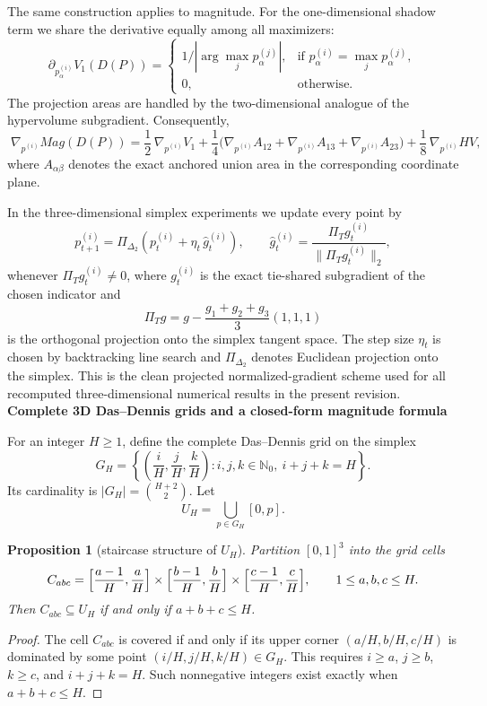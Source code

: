 \documentclass{article}
\def\HV{HV}%
\def\Mag{Mag}%
\newtheorem{proposition}[theorem]{Proposition}
\theoremstyle{definition}
\newcommand{\Mag}{\operatorname{Mag}}
\newcommand{\HV}{\operatorname{HV}}
\newcommand{\1}{\mathbf{1}}
\newcommand{\myparagraph}[1]{\medskip\noindent\textbf{#1}}
\begin{document}
The same construction applies to magnitude. For the one-dimensional shadow term we share the derivative equally among all maximizers:
\[
\partial_{p^{(i)}_\alpha}V_1(D(P))
=
\begin{cases}
1/|\arg\max_j p^{(j)}_\alpha|, & \text{if }p^{(i)}_\alpha=\max_j p^{(j)}_\alpha,\\[0.5ex]
0, & \text{otherwise.}
\end{cases}
\]
The projection areas are handled by the two-dimensional analogue of the hypervolume subgradient. Consequently,
\[
\boxed{\;
\nabla_{p^{(i)}}\Mag(D(P))
=
\frac12\,\nabla_{p^{(i)}}V_1
+\frac14\bigl(\nabla_{p^{(i)}}A_{12}+\nabla_{p^{(i)}}A_{13}+\nabla_{p^{(i)}}A_{23}\bigr)
+\frac18\,\nabla_{p^{(i)}}\HV, \;}
\]
where $A_{\alpha\beta}$ denotes the exact anchored union area in the corresponding coordinate plane.

In the three-dimensional simplex experiments we update every point by
\[
p^{(i)}_{t+1}
=
\Pi_{\Delta_2}\!\left(p^{(i)}_t+\eta_t\,\widehat g^{(i)}_t\right),
\qquad
\widehat g^{(i)}_t
=
\frac{\Pi_T g^{(i)}_t}{\|\Pi_T g^{(i)}_t\|_2},
\]
whenever $\Pi_T g^{(i)}_t\neq 0$, where $g^{(i)}_t$ is the exact tie-shared subgradient of the chosen indicator and
\[
\Pi_T g = g-\frac{g_1+g_2+g_3}{3}(1,1,1)
\]
is the orthogonal projection onto the simplex tangent space. The step size $\eta_t$ is chosen by backtracking line search and $\Pi_{\Delta_2}$ denotes Euclidean projection onto the simplex. This is the clean projected normalized-gradient scheme used for all recomputed three-dimensional numerical results in the present revision.
\myparagraph{Complete 3D Das--Dennis grids and a closed-form magnitude formula}

For an integer $H\ge 1$, define the complete Das--Dennis grid on the simplex
\[
G_H=\left\{\left(\frac{i}{H},\frac{j}{H},\frac{k}{H}\right): i,j,k\in\mathbb N_0,\ i+j+k=H\right\}.
\]
Its cardinality is $|G_H|=\binom{H+2}{2}$. Let
\[
U_H=\bigcup_{p\in G_H}[0,p].
\]

\begin{proposition}[staircase structure of $U_H$]
Partition $[0,1]^3$ into the grid cells
\[
C_{abc}=\Bigl[\frac{a-1}{H},\frac{a}{H}\Bigr]\times \Bigl[\frac{b-1}{H},\frac{b}{H}\Bigr]\times \Bigl[\frac{c-1}{H},\frac{c}{H}\Bigr],
\qquad 1\le a,b,c\le H.
\]
Then $C_{abc}\subseteq U_H$ if and only if $a+b+c\le H$.
\end{proposition}

\begin{proof}
The cell $C_{abc}$ is covered if and only if its upper corner $(a/H,b/H,c/H)$ is dominated by some point $(i/H,j/H,k/H)\in G_H$. This requires $i\ge a$, $j\ge b$, $k\ge c$, and $i+j+k=H$. Such nonnegative integers exist exactly when $a+b+c\le H$.
\end{proof}
\end{document}
